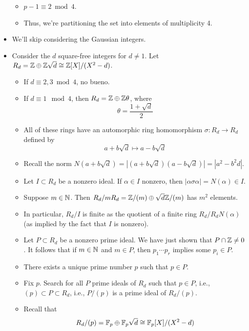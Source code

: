 \documentclass[../notes.tex]{subfiles}
\begin{document}
\begin{itemize}
\begin{itemize}
        \item $p-1\equiv 2\bmod 4$.
        \item Thus, we're partitioning the set into elements of multiplicity 4.
    \end{itemize}
    \item We'll skip considering the Gaussian integers.
    \item Consider the $d$ square-free integers for $d\neq 1$. Let $R_d=\mathbb{Z}\oplus\mathbb{Z}\sqrt{d}\cong\mathbb{Z}[X]/(X^2-d)$.
    \begin{itemize}
        \item If $d\equiv 2,3\bmod 4$, no bueno.
        \item If $d\equiv 1\mod 4$, then $R_d=\mathbb{Z}\oplus\mathbb{Z}\theta$, where
        \begin{equation*}
            \theta = \frac{1+\sqrt{d}}{2}
        \end{equation*}
        \item All of these rings have an automorphic ring homomorphism $\sigma:R_d\to R_d$ defined by
        \begin{equation*}
            a+b\sqrt{d} \mapsto a-b\sqrt{d}
        \end{equation*}
        \item Recall the norm $N(a+b\sqrt{d})=|(a+b\sqrt{d})(a-b\sqrt{d})|=|a^2-b^2d|$.
        \item Let $I\subset R_d$ be a nonzero ideal. If $\alpha\in I$ nonzero, then $|\alpha\sigma\alpha|=N(\alpha)\in I$.
        \item Suppose $m\in\mathbb{N}$. Then $R_d/mR_d=\mathbb{Z}/(m)\oplus\sqrt{d}\mathbb{Z}/(m)$ has $m^2$ elements.
        \item In particular, $R_d/I$ is finite as the quotient of a finite ring $R_d/R_dN(\alpha)$ (as implied by the fact that $I$ is nonzero).
        \item Let $P\subset R_d$ be a nonzero prime ideal. We have just shown that $P\cap\mathbb{Z}\neq 0$. It follows that if $m\in\mathbb{N}$ and $m\in P$, then $p_1\cdots p_r$ implies some $p_i\in P$.
        \item There exists a unique prime number $p$ such that $p\in P$.
        \item Fix $p$. Search for all $P$ prime ideals of $R_d$ such that $p\in P$, i.e., $(p)\subset P\subset R_d$, i.e., $P/(p)$ is a prime ideal of $R_d/(p)$.
        \item Recall that
        \begin{equation*}
            R_d/(p) = \F_p\oplus\F_p\sqrt{d} \cong \F_p[X]/(X^2-d)

\end{equation*}
\end{itemize}
\end{itemize}
\end{document}
